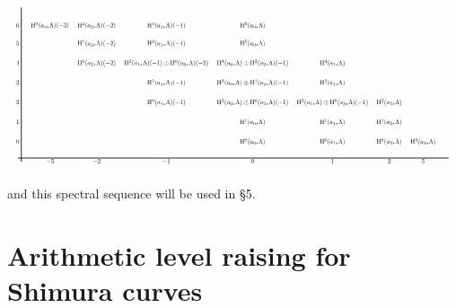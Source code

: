 \documentclass[10pt]{amsart}
\numberwithin{equation}{section}
\theoremstyle{plain}
\numberwithin{equation}{section}
\theoremstyle{definition}
\theoremstyle{remark}
\def\rmH{\mathrm{H}}
\begin{document}
\begin{equation}\label{E1-primitive}
\begin{tikzpicture}[thick,scale=0.65, every node/.style={scale=0.65}]
\matrix (m) [matrix of math nodes,
    nodes in empty cells,nodes={minimum width=5ex,
    minimum height=5ex,outer sep=-5pt},
    column sep=1ex,row sep=1ex]{
                &      &     &     & \\
          6    &\rmH^{0}(a_{3*}\Lambda)(-3) &  \rmH^{2}(a_{2*}\Lambda)(-2)  &\rmH^{4}(a_{1*}\Lambda)(-1) & \rmH^{6}(a_{0*}\Lambda) \\
          5    &    &\rmH^{1}(a_{2*}\Lambda)(-2)  &\rmH^{3}(a_{1*}\Lambda)(-1) &\rmH^{5}(a_{0*}\Lambda)& \\
          4    &       &\rmH^{0}(a_{2*}\Lambda)(-2) &\rmH^{2}(a_{1*}\Lambda)(-1)\oplus\rmH^{0}(a_{3*}\Lambda)(-2) &\rmH^{4}(a_{0*}\Lambda)\oplus\rmH^{2}(a_{2*}\Lambda)(-1)&\rmH^{4}(a_{1*}\Lambda)\\
          3   &        &         &\rmH^{1}(a_{1*}\Lambda)(-1)  &\rmH^{3}(a_{0*}\Lambda)\oplus\rmH^{1}(a_{2*}\Lambda)(-1) &\rmH^{3}(a_{1*}\Lambda)\\
          2   &        &         &\rmH^{0}(a_{1*}\Lambda)(-1)  &\rmH^{2}(a_{0*}\Lambda)\oplus\rmH^{0}(a_{2*}\Lambda)(-1) &\rmH^{2}(a_{1*}\Lambda)\oplus \rmH^{0}(a_{3*}\Lambda)(-1) &\rmH^{2}(a_{2*}\Lambda)\\
           1   &        &         &                             &\rmH^{1}(a_{0*}\Lambda) &\rmH^{1}(a_{1*}\Lambda) &\rmH^{1}(a_{2*}\Lambda)\\
           0   &        &         &       &\rmH^{0}(a_{0*}\Lambda) &\rmH^{0}(a_{1*}\Lambda) &\rmH^{0}(a_{2*}\Lambda)& \rmH^{3}(a_{3*}\Lambda)\\
          \quad\strut & -3  &  -2  &  -1  & 0 &1 &2 &3 & \strut \\};

\draw[thick] (m-1-1.east) -- (m-9-1.east) ;
\draw[thick] (m-9-1.north) -- (m-9-9.north) ;
\end{tikzpicture}
\end{equation}
and this spectral sequence will be used in \S 5.


\section{Arithmetic level raising for Shimura curves}
\end{document}
